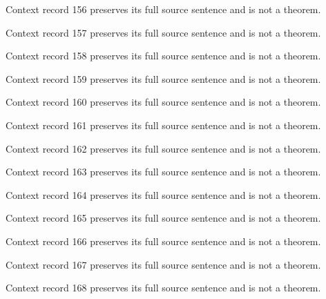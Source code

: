 \documentclass{article}
\begin{document}
\begin{remark}\label{train:context:156}Context record 156 preserves its full source sentence and is not a theorem.\end{remark}
\begin{remark}\label{train:context:157}Context record 157 preserves its full source sentence and is not a theorem.\end{remark}
\begin{remark}\label{train:context:158}Context record 158 preserves its full source sentence and is not a theorem.\end{remark}
\begin{remark}\label{train:context:159}Context record 159 preserves its full source sentence and is not a theorem.\end{remark}
\begin{remark}\label{train:context:160}Context record 160 preserves its full source sentence and is not a theorem.\end{remark}
\begin{remark}\label{train:context:161}Context record 161 preserves its full source sentence and is not a theorem.\end{remark}
\begin{remark}\label{train:context:162}Context record 162 preserves its full source sentence and is not a theorem.\end{remark}
\begin{remark}\label{train:context:163}Context record 163 preserves its full source sentence and is not a theorem.\end{remark}
\begin{remark}\label{train:context:164}Context record 164 preserves its full source sentence and is not a theorem.\end{remark}
\begin{remark}\label{train:context:165}Context record 165 preserves its full source sentence and is not a theorem.\end{remark}
\begin{remark}\label{train:context:166}Context record 166 preserves its full source sentence and is not a theorem.\end{remark}
\begin{remark}\label{train:context:167}Context record 167 preserves its full source sentence and is not a theorem.\end{remark}
\begin{remark}\label{train:context:168}Context record 168 preserves its full source sentence and is not a theorem.\end{remark}
\end{document}
